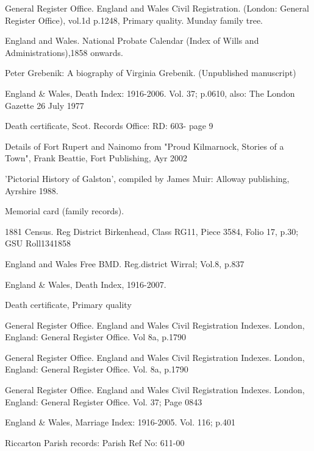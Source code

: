 \begin{thebibliography}{99}
	General Register Office. England and Wales Civil Registration. (London: General Register Office), vol.1d p.1248, Primary quality.
	Munday family tree. 
	
	England and Wales. National Probate Calendar (Index of Wills and Administrations),1858 onwards. 
	
	Peter Grebenik: A biography of Virginia Grebenik. (Unpublished manuscript)

	England \& Wales, Death Index: 1916-2006. Vol. 37; p.0610, also:
	The London Gazette 26 July 1977

	Death certificate, Scot. Records Office: RD: 603- page 9

	Details of Fort Rupert and Nainomo from "Proud Kilmarnock, Stories of a Town", Frank Beattie, Fort Publishing, Ayr 2002

	'Pictorial History of Galston', compiled by James Muir: Alloway publishing, Ayrshire 1988.

	 Memorial card (family records).
	 
	1881 Census. Reg District Birkenhead, Class RG11, Piece 3584, Folio 17, p.30; GSU Roll1341858
	
	England and Wales Free BMD. Reg.district Wirral; Vol.8, p.837
	
	England \& Wales, Death Index, 1916-2007.
	
	Death certificate, Primary quality
	
	General Register Office. England and Wales Civil Registration Indexes. London, England: General Register 		Office. Vol 8a, p.1790

	General Register Office. England and Wales Civil Registration Indexes. London, England: General Register 		Office. Vol. 8a, p.1790
	
	General Register Office. England and Wales Civil Registration Indexes. London, England: General Register 		Office. Vol. 37; Page 0843
	
	England \& Wales, Marriage Index: 1916-2005. Vol. 116; p.401

	Riccarton Parish records: Parish Ref No: 611-00
	

\end{thebibliography}

